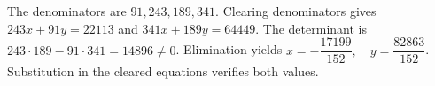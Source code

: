 The denominators are $91,243,189,341$. Clearing denominators gives $243x+91y=22113$ and $341x+189y=64449$. The determinant is $243\cdot189-91\cdot341=14896\ne0$. Elimination yields $\boxed{x=-\dfrac{17199}{152},\quad y=\dfrac{82863}{152}}$. Substitution in the cleared equations verifies both values.
